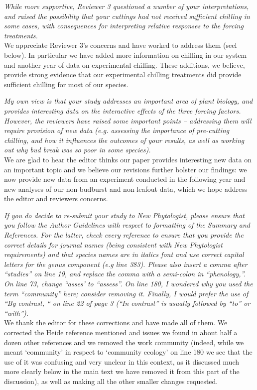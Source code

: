 \documentclass[11pt,a4paper]{article}
\begin{document}
\emph{While more supportive, Reviewer 3 questioned a number of your interpretations, and raised the
possibility that your cuttings had not received sufficient chilling in some cases, with
consequences for interpreting relative responses to the forcing treatments.}\\

We appreciate Reviewer 3's concerns and have worked to address them (seel below). In particular we have added more information on chilling in our system and another year of data on experimental chilling. These additions, we believe, provide strong evidence that our experimental chilling treatments did provide sufficient chilling for most of our species. 

\emph{My own view is that your study addresses an important area of plant biology, and provides
interesting data on the interactive effects of the three forcing factors.  However, the
reviewers have raised some important points – addressing them will require provision of new
data (e.g. assessing the importance of pre-cutting chilling, and how it influences the
outcomes of your results, as well as working out why bud break was so poor in some species).}\\

We are glad to hear the editor thinks our paper provides interesting new data on an important topic and we believe our revisions further bolster our findings: we now provide new data from an experiment conducted in the following year and new analyses of our non-budburst and non-leafout data, which we hope address the editor and reviewers concerns. 

\emph{If you do decide to re-submit your study to New Phytologist, please ensure that you follow
the Author Guidelines with respect to formatting of the Summary and References.  For the
latter, check every reference to ensure that you provide the correct details for journal
names (being consistent with New Phytologist requirements) and that species names are in
italics font and use correct capital letters for the genus component (e.g line 383).  Please
also insert a comma after “studies” on line 19, and replace the comma with a semi-colon in
“phenology,”.  On line 73, change “asses’ to “assess”. On line 180, I wondered why you used
the term “community” here; consider removing it.  Finally, I would prefer the use of “By
contrast, “ on line 22 of page 3 (“In contrast” is usually followed by “to” or “with”).}\\

We thank the editor for these corrections and have made all of them. We corrected the Heide reference mentioned and issues we found in about half a dozen other references and we removed the work community (indeed, while we meant `community' in respect to `community ecology' on line 180 we see that the use of it was confusing and very unclear in this context, as it discussed much more clearly below in the main text we have removed it from this part of the discussion), as well as making all the other smaller changes requested. \\
\end{document}
